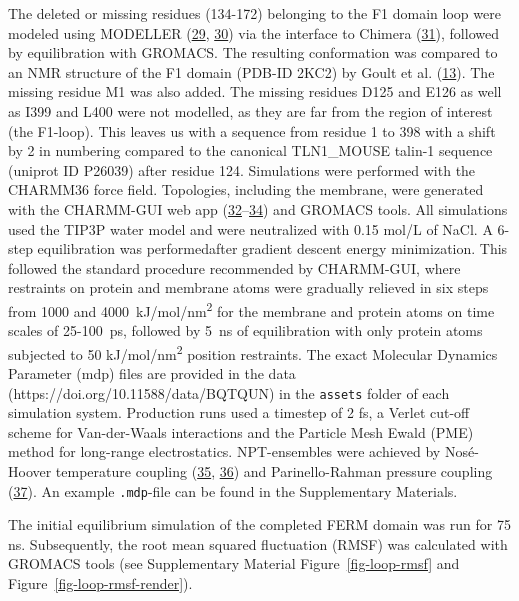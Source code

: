 \documentclass[
  twocolumn]{biophys-new-mod}
\begin{document}
The deleted or missing residues (134-172) belonging to the F1 domain
loop were modeled using MODELLER
(\protect\hyperlink{ref-marti-renomComparativeProteinStructure2000}{29},
\protect\hyperlink{ref-webbComparativeProteinStructure2016}{30}) via the
interface to Chimera
(\protect\hyperlink{ref-pettersenUCSFChimeraVisualization2004}{31}),
followed by equilibration with GROMACS. The resulting conformation was
compared to an NMR structure of the F1 domain (PDB-ID 2KC2) by Goult et
al. (\protect\hyperlink{ref-goultStructureDoubleUbiquitinlike2010}{13}).
The missing residue M1 was also added. The missing residues D125 and
E126 as well as I399 and L400 were not modelled, as they are far from
the region of interest (the F1-loop). This leaves us with a sequence
from residue 1 to 398 with a shift by 2 in numbering compared to the
canonical TLN1\_MOUSE talin-1 sequence (uniprot ID P26039) after residue
124. Simulations were performed with the CHARMM36 force field.
Topologies, including the membrane, were generated with the CHARMM-GUI
web app
(\protect\hyperlink{ref-brooksCHARMMBiomolecularSimulation2009}{32}--\protect\hyperlink{ref-leeCHARMMGUIInputGenerator2016}{34})
and GROMACS tools. All simulations used the TIP3P water model and were
neutralized with 0.15 mol/L of NaCl. A 6-step equilibration was
performedafter gradient descent energy minimization. This followed the
standard procedure recommended by CHARMM-GUI, where restraints on
protein and membrane atoms were gradually relieved in six steps from
1000 and 4000~kJ/mol/nm\textsuperscript{2} for the membrane and protein
atoms on time scales of 25-100~ps, followed by 5~ns of equilibration
with only protein atoms subjected to 50 kJ/mol/nm\textsuperscript{2}
position restraints. The exact Molecular Dynamics Parameter (mdp) files
are provided in the data (https://doi.org/10.11588/data/BQTQUN) in the
\texttt{assets} folder of each simulation system. Production runs used a
timestep of 2 fs, a Verlet cut-off scheme for Van-der-Waals interactions
and the Particle Mesh Ewald (PME) method for long-range electrostatics.
NPT-ensembles were achieved by Nosé-Hoover temperature coupling
(\protect\hyperlink{ref-hooverCanonicalDynamicsEquilibrium1985}{35},
\protect\hyperlink{ref-noseUnifiedFormulationConstant1984}{36}) and
Parinello-Rahman pressure coupling
(\protect\hyperlink{ref-parrinelloPolymorphicTransitionsSingle1981}{37}).
An example \texttt{.mdp}-file can be found in the Supplementary
Materials.

The initial equilibrium simulation of the completed FERM domain was run
for 75 ns. Subsequently, the root mean squared fluctuation (RMSF) was
calculated with GROMACS tools (see Supplementary Material
Figure~\ref{fig-loop-rmsf} and Figure~\ref{fig-loop-rmsf-render}).
\end{document}
